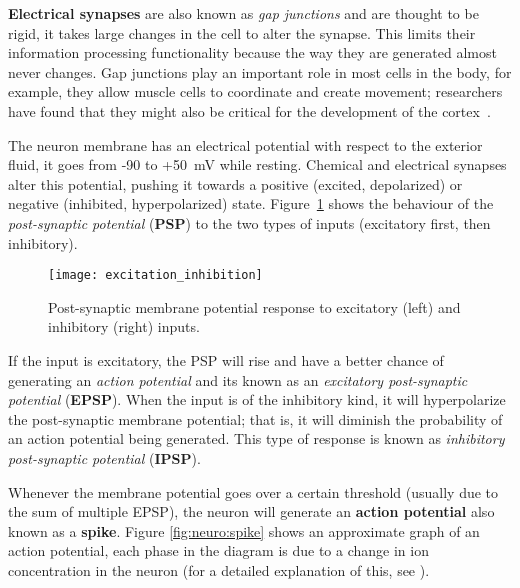 \textbf{Electrical synapses} are also known as \emph{gap junctions} and are thought to be rigid, it takes large changes in the cell to alter the synapse. This limits their information processing functionality because the way they are generated almost never changes. Gap junctions play an important role in most cells in the body, for example, they allow muscle cells to coordinate and create movement; researchers have found that they might also be critical for the development of the cortex~\cite{gap-junctions-pmid20066080,thompson2000brain}. 

The neuron membrane has an electrical potential with respect to the exterior fluid, it goes from -90 to +50~mV while resting. Chemical and electrical synapses alter this potential, pushing it towards a positive (excited, depolarized) or negative (inhibited, hyperpolarized) state. Figure~\ref{fig:neuro:exc_inh} shows the behaviour of the \emph{post-synaptic potential} (\textbf{PSP}) to the two types of inputs (excitatory first, then inhibitory). 

\begin{figure}[hbt]
  \begin{center}
    \texttt{[image: excitation\_inhibition]}
    \caption{Post-synaptic membrane potential response to excitatory (left) and inhibitory (right) inputs.}
    \label{fig:neuro:exc_inh}
  \end{center}
\end{figure}

If the input is excitatory, the PSP will rise and have a better chance of generating an \emph{action potential} and its known as an \emph{excitatory post-synaptic potential} (\textbf{EPSP}). When the input is of the inhibitory kind, it will hyperpolarize the post-synaptic membrane potential; that is, it will diminish the probability of an action potential being generated. This type of response is known as \emph{inhibitory post-synaptic potential} (\textbf{IPSP}).

Whenever the membrane potential goes over a certain threshold (usually due to the sum of multiple EPSP), the neuron will generate an \textbf{action potential} also known as a \textbf{spike}. Figure \ref{fig:neuro:spike} shows an approximate graph of an action potential, each phase in the diagram is due to a change in ion concentration in the neuron (for a detailed explanation of this, see \cite{thompson2000brain}).

